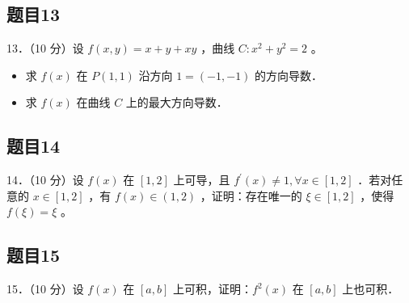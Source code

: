 \documentclass{article}
\begin{document}
\subsection{题目13}
13．（10 分）设 \(f(x, y)=x+y+x y\) ，曲线 \(C: x^{2}+y^{2}=2\) 。

\begin{itemize}
  \item[（1）] 求 \(f(x)\) 在 \(P(1,1)\) 沿方向 \(1=(-1,-1)\) 的方向导数．
  \item[（2）] 求 \(f(x)\) 在曲线 \(C\) 上的最大方向导数．
\end{itemize}

\subsection{题目14}
14．（10 分）设 \(f(x)\) 在 \([1,2]\) 上可导，且 \(f^{\prime}(x) \neq 1, \forall x \in[1,2]\) ．若对任意的 \(x \in[1,2]\) ，有 \(f(x) \in(1,2)\) ，证明：存在唯一的 \(\xi \in[1,2]\) ，使得 \(f(\xi)=\xi\) 。

\subsection{题目15}
15．（10 分）设 \(f(x)\) 在 \([a, b]\) 上可积，证明：\(f^{2}(x)\) 在 \([a, b]\) 上也可积．
\end{document}
